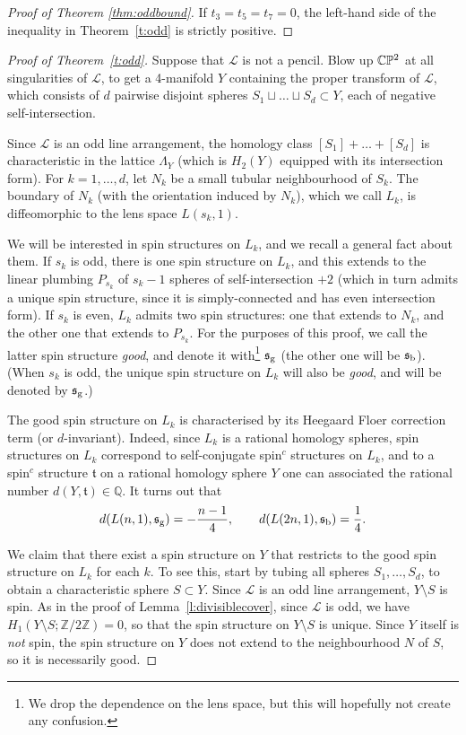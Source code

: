 \documentclass[a4paper,12pt, onesided]{amsart}
\theoremstyle{remark}
\numberwithin{figure}{section}
\numberwithin{equation}{section}
\newcommand{\Z}{\mathbb{Z}}
\newcommand{\Q}{\mathbb{Q}}
\newcommand{\CP}{\mathbb{CP}\vphantom{\mathbb{P}}^2}
\renewcommand{\L}{\mathcal{L}}
\newcommand{\fs}{\mathfrak{s}}
\newcommand{\ft}{\mathfrak{t}}
\begin{document}
\begin{proof}[Proof of Theorem \ref{thm:oddbound}]
If $t_3 = t_5 = t_7 = 0$, the left-hand side of the inequality in Theorem~\ref{t:odd} is strictly positive.
\end{proof}


\begin{proof}[Proof of Theorem~\ref{t:odd}]
Suppose that $\L$ is not a pencil. Blow up $\CP$ at all singularities of $\L$, to get a 4-manifold $Y$ containing the proper transform of $\L$, which consists of $d$ pairwise disjoint spheres $S_1 \sqcup \dots \sqcup S_d \subset Y$, each of negative self-intersection.

Since $\L$ is an odd line arrangement, the homology class $[S_1] + \dots + [S_d]$ is characteristic in the lattice $\Lambda_Y$ (which is $H_2(Y)$ equipped with its intersection form).
For $k = 1, \dots, d$, let $N_k$ be a small tubular neighbourhood of $S_k$.
The boundary of $N_k$ (with the orientation induced by $N_k$), which we call $L_k$, is diffeomorphic to the lens space $L(s_k, 1)$.

We will be interested in spin structures on $L_k$, and we recall a general fact about them.
If $s_k$ is odd, there is one spin structure on $L_k$, and this extends to the linear plumbing $P_{s_k}$ of $s_k-1$ spheres of self-intersection $+2$ (which in turn admits a unique spin structure, since it is simply-connected and has even intersection form).
If $s_k$ is even, $L_k$ admits two spin structures: one that extends to $N_k$, and the other one that extends to $P_{s_k}$.
For the purposes of this proof, we call the latter spin structure \emph{good}, and denote it with\footnote{We drop the dependence on the lens space, but this will hopefully not create any confusion.} $\fs_{\rm g}$ (the other one will be $\fs_{\rm b}$).
(When $s_k$ is odd, the unique spin structure on $L_k$ will also be \emph{good}, and will be denoted by $\fs_{\rm g}$.)

The good spin structure on $L_k$ is characterised by its Heegaard Floer correction term (or $d$-invariant).
Indeed, since $L_k$ is a rational homology spheres, spin structures on $L_k$ correspond to self-conjugate spin$^c$ structures on $L_k$, and to a spin$^c$ structure $\ft$ on a rational homology sphere $Y$ one can associated the rational number $d(Y,\ft)\in \Q$.
It turns out that
\[
d(L(n,1),\fs_{\rm g}) = -\frac{n-1}4,\qquad d(L(2n,1),\fs_{\rm b}) = \frac14.
\]

We claim that there exist a spin structure on $Y$ that restricts to the good spin structure on $L_k$ for each $k$.
To see this, start by tubing all spheres $S_1, \dots, S_d$, to obtain a characteristic sphere $S \subset Y$.
Since $\L$ is an odd line arrangement, $Y\setminus S$ is spin.
As in the proof of Lemma~\ref{l:divisiblecover}, since $\L$ is odd, we have $H_1(Y\setminus S; \Z/2\Z) = 0$, so that the spin structure on $Y \setminus S$ is unique.
Since $Y$ itself is \emph{not} spin, the spin structure on $Y$ does not extend to the neighbourhood $N$ of $S$, so it is necessarily good.


\end{proof}
\end{document}

